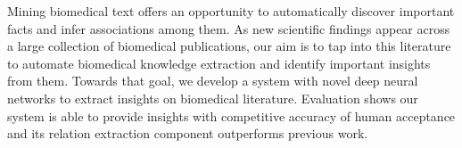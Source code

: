 Mining biomedical text offers an opportunity to automatically discover important facts and infer associations among them. As new scientific findings appear across a large collection of biomedical publications, our aim is to tap into this literature to automate biomedical knowledge extraction and identify important insights from them. Towards that goal, we develop a system with novel deep neural networks to extract insights on biomedical literature. Evaluation shows our system is able to provide insights with competitive accuracy of human acceptance and its relation extraction component outperforms previous work.
